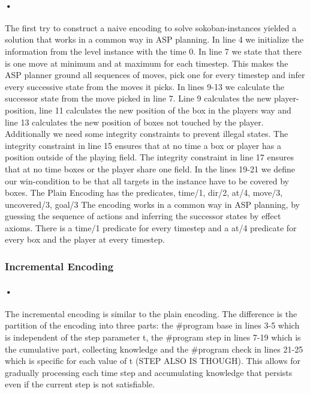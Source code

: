 \documentclass{article}
\begin{document}
\paragraph*{•}

The first try to construct a naive encoding to solve sokoban-instances yielded a solution that works in a common way in ASP planning. In line 4 we initialize the information from the level instance with the time 0. In line 7 we state that there is one move at minimum and at maximum for each timestep. This makes the ASP planner ground all sequences of moves, pick one for every timestep and infer every successive state from the moves it picks. In lines 9-13 we calculate the successor state from the move picked in line 7. Line 9 calculates the new player-position, line 11 calculates the new position of the box in the players way and line 13 calculates the new position of boxes not touched by the player. Additionally we need some integrity constraints to prevent illegal states. The integrity constraint in line 15 ensures that at no time a box or player has a position outside of the playing field. The integrity constraint in line 17 ensures that at no time boxes or the player share one field.
In the lines 19-21 we define our win-condition to be that all targets in the instance have to be covered by boxes.
The Plain Encoding has the predicates, time/1, dir/2, at/4, move/3, uncovered/3, goal/3
The encoding works in a common way in ASP planning, by guessing the sequence of actions and inferring the successor states by effect axioms. There is a time/1 predicate for every timestep and a at/4 predicate for every box and the player at every timestep.

\subsubsection{Incremental Encoding}
\paragraph*{•}

The incremental encoding is similar to the plain encoding. The difference is the partition of the encoding into three parts: the \#program base in lines 3-5 which is independent of the step parameter t, the \#program step in lines 7-19 which is the cumulative part, collecting knowledge and the \#program check in lines 21-25 which is specific for each value of t (STEP ALSO IS THOUGH). This allows for gradually processing each time step and accumulating knowledge that persists even if the current step is not satisfiable.
\end{document}
